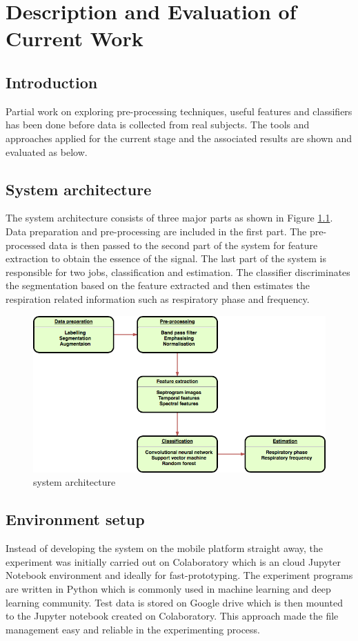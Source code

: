 \chapter{Description and Evaluation of Current Work}
\section{Introduction}
Partial work on exploring pre-processing techniques, useful features and classifiers has been done before data is collected from real subjects. The tools and approaches applied for the current stage and the associated results are shown and evaluated as below.

\section{System architecture}
The system architecture consists of three major parts as shown in Figure \ref{fig:system_architecture}. Data preparation and pre-processing are included in the first part. The pre-processed data is then passed to the second part of the system for feature extraction to obtain the essence of the signal. The last part of the system is responsible for two jobs, classification and estimation. The classifier discriminates the segmentation based on the feature extracted and then estimates the respiration related information such as respiratory phase and frequency. 

\begin{figure}[h]
    \centerline{\includegraphics[scale=0.5]{figures/system_architecture.png}}
    \caption{system architecture}
    \label{fig:system_architecture}
\end{figure}


\section{Environment setup}
Instead of developing the system on the mobile platform straight away, the experiment was initially carried out on Colaboratory which is an cloud Jupyter Notebook environment and ideally for fast-prototyping. The experiment programs are written in Python which is commonly used in machine learning and deep learning community. Test data is stored on Google drive which is then mounted to the Jupyter notebook created on Colaboratory. This approach made the file management easy and reliable in the experimenting process. 

